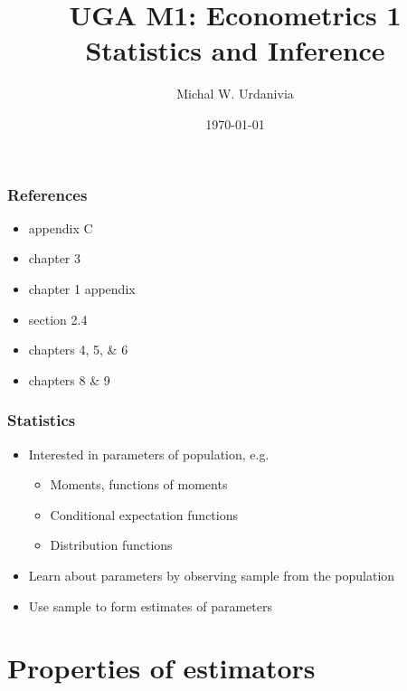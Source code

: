 
\title[Econometrics 1: Introduction]{UGA M1: Econometrics 1\\ \textbf{Statistics and Inference}}
\date{\today}
\author{Michal W. Urdanivia\inst{*}}




\frame{\titlepage}

\begin{frame}
  \tableofcontents  
\end{frame}

\begin{frame}\frametitle{References}
  \begin{itemize}
  \item \cite{w2013} appendix C
  \item \cite{sw2009} chapter 3
  \item \cite{ap2014} chapter 1 appendix
  \item \cite{abbring2001} section 2.4
  \item \cite{dbc2012} chapters 4, 5, \& 6
  \item \cite{gs2003} chapters 8 \& 9
  \end{itemize}
\end{frame}

\begin{frame}
  \frametitle{Statistics}
  \begin{itemize}
  \item Interested in \alert{parameters} of population, e.g.\
    \begin{itemize}
    \item Moments, functions of moments
    \item Conditional expectation functions
    \item Distribution functions      
    \end{itemize}
  \item Learn about parameters by observing sample from the population    
  \item Use sample to form estimates of parameters
  \end{itemize}
\end{frame}

\section{Properties of estimators}
